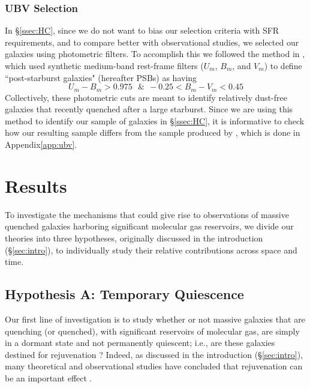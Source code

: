 \documentclass[twocolumn, linenumbers]{aastex631}
\newcommand{\app}{Appendix\hspace{.2em}}
\begin{document}
\subsubsection{UBV Selection}
\label{ssec:ubvSelect}
In \S\ref{ssec:HC}, since we do not want to bias our selection criteria with SFR requirements, and to compare better with observational studies, we selected our galaxies using photometric filters.  To accomplish this we followed the method in \cite{suessSquiggle}, which used synthetic medium-band rest-frame filters ($U_m$, $B_m$, and $V_m$) to define ``post-starburst galaxies" (hereafter PSBs) as having
\begin{equation}
U_m-B_m>0.975\ \ \ \&\ \ -0.25<B_m-V_m<0.45
\label{eq:UBVSelect}
\end{equation}
Collectively, these photometric cuts are meant to identify relatively dust-free galaxies that recently quenched after a large starburst.  Since we are using this method to identify our sample of galaxies in \S\ref{ssec:HC}, it is informative to check how our resulting sample differs from the sample produced by \cite{suessSquiggle}, which is done in \app \ref{app:ubv}.

\section{Results}
\label{sec:results}
To investigate the mechanisms that could give rise to observations of massive quenched galaxies harboring significant molecular gas reservoirs, we divide our theories into three hypotheses, originally discussed in the introduction (\S \ref{sec:intro}), to individually study their relative contributions across space and time.

\subsection{Hypothesis A: Temporary Quiescence}
\label{ssec:HA}
Our first line of investigation is to study whether or not massive galaxies that are quenching (or quenched), with significant reservoirs of molecular gas, are simply in a dormant state and not permanently quiescent; i.e., are these galaxies destined for rejuvenation \citep{remus2023, Kimmig25}?  Indeed, as discussed in the introduction (\S\ref{sec:intro}), many theoretical and observational studies have concluded that rejuvenation can be an important effect \citep{Lotz21, remus2023, Kimmig25, harrold2025, colibre, cenci25, setton2025}.
\end{document}
